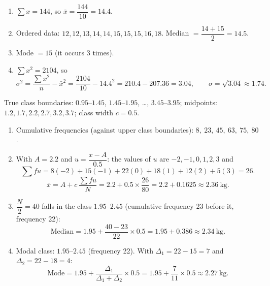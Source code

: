 \documentclass[11pt]{article}
\newcounter{popsec}
\newcounter{popsub}
\newcommand{\courssub}[1]{%
  \stepcounter{popsub}%
  \par\vspace{9pt}\noindent{\popxbold\fontsize{11.5}{13}\selectfont\color{popink}{\color{poporange}\thepopsec.\thepopsub}\hspace{6pt}#1}\par\nopagebreak\vspace{4pt}
}
\begin{document}
\begin{corrige}
\begin{enumerate}
\item $\sum x = 144$, so $\bar{x} = \dfrac{144}{10} = 14.4$.
\item Ordered data: $12, 12, 13, 14, 14, 15, 15, 15, 16, 18$. Median $= \dfrac{14+15}{2} = 14.5$.
\item Mode $= 15$ (it occurs 3 times).
\item $\sum x^2 = 2104$, so
\[
\sigma^2 = \frac{\sum x^2}{n} - \bar{x}^2 = \frac{2104}{10} - 14.4^2 = 210.4 - 207.36 = 3.04,
\qquad \sigma = \sqrt{3.04} \approx 1.74.
\]
\end{enumerate}
\end{corrige}

\courssub{I practise}

\begin{corrige}
True class boundaries: $0.95$--$1.45$, $1.45$--$1.95$, \dots, $3.45$--$3.95$; midpoints: $1.2, 1.7, 2.2, 2.7, 3.2, 3.7$; class width $c = 0.5$.
\begin{enumerate}
\item Cumulative frequencies (against upper class boundaries): $8,\ 23,\ 45,\ 63,\ 75,\ 80$.
\item With $A = 2.2$ and $u = \dfrac{x - A}{0.5}$: the values of $u$ are $-2, -1, 0, 1, 2, 3$ and
\[
\sum fu = 8(-2) + 15(-1) + 22(0) + 18(1) + 12(2) + 5(3) = 26.
\]
\[
\bar{x} = A + c\,\frac{\sum fu}{N} = 2.2 + 0.5\times\frac{26}{80} = 2.2 + 0.1625 \approx 2.36\ \text{kg}.
\]
\item $\dfrac{N}{2} = 40$ falls in the class $1.95$--$2.45$ (cumulative frequency 23 before it, frequency 22):
\[
\text{Median} = 1.95 + \frac{40 - 23}{22}\times 0.5 = 1.95 + 0.386 \approx 2.34\ \text{kg}.
\]
\item Modal class: $1.95$--$2.45$ (frequency 22). With $\Delta_1 = 22 - 15 = 7$ and $\Delta_2 = 22 - 18 = 4$:
\[
\text{Mode} = 1.95 + \frac{\Delta_1}{\Delta_1 + \Delta_2}\times 0.5 = 1.95 + \frac{7}{11}\times 0.5 \approx 2.27\ \text{kg}.
\]
\end{enumerate}
\end{corrige}
\end{document}
